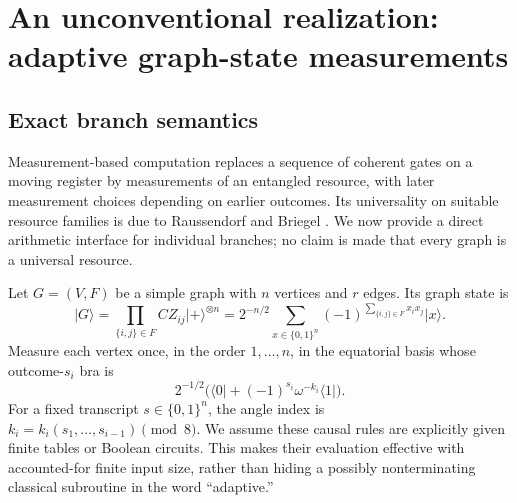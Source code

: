 \documentclass[11pt,letterpaper]{article}
\numberwithin{equation}{section}
\theoremstyle{definition}
\theoremstyle{remark}
\newcommand{\srcmark}[1]{\par\noindent{\small\itshape [source~#1]}\par}
\newcommand{\ket}[1]{\lvert #1\rangle}
\newcommand{\bra}[1]{\langle #1\rvert}
\begin{document}
\section{An unconventional realization: adaptive graph-state measurements}
\label{pqc:cc:sec:mbqc}
\srcmark{10}

\subsection{Exact branch semantics}

Measurement-based computation replaces a sequence of coherent gates on a moving
register by measurements of an entangled resource, with later measurement
choices depending on earlier outcomes. Its universality on suitable resource
families is due to Raussendorf and Briegel \cite{b62s10-RaussendorfBriegel}. We now
provide a direct arithmetic interface for individual branches; no claim is
made that every graph is a universal resource.

Let $G=(V,F)$ be a simple graph with $n$ vertices and $r$ edges. Its graph state is
\begin{equation}
 \ket G=\prod_{\{i,j\}\in F}CZ_{ij}\ket+^{\otimes n}
 =2^{-n/2}\sum_{x\in\{0,1\}^n}
       (-1)^{\sum_{\{i,j\}\in F}x_i x_j}\ket x.
\label{pqc:cc:eq:graphstate}
\end{equation}
Measure each vertex once, in the order $1,\ldots,n$, in the equatorial basis
whose outcome-$s_i$ bra is
\begin{equation}
 2^{-1/2}\bigl(\bra0+(-1)^{s_i}\omega^{-k_i}\bra1\bigr).
\label{pqc:cc:eq:equatorialbra}
\end{equation}
For a fixed transcript $s\in\{0,1\}^n$, the angle index is
$k_i=k_i(s_1,\ldots,s_{i-1})\pmod8$. We assume these causal rules are explicitly
given finite tables or Boolean circuits. This makes their evaluation effective
with accounted-for finite input size, rather than hiding a possibly
nonterminating classical subroutine in the word ``adaptive.''
\end{document}
